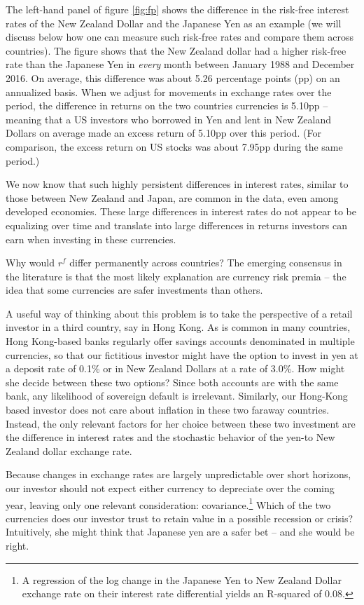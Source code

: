 \documentclass{ar-1col}
\begin{document}
The left-hand panel of figure \ref{fig:fp} shows the difference in the risk-free interest rates of the New Zealand Dollar and the Japanese Yen as an example (we will discuss below how one can measure such risk-free rates and compare them across countries). The figure shows that the New Zealand dollar had a higher risk-free rate than the Japanese Yen in \textit{every} month between January 1988 and December 2016. On average, this difference was about 5.26 percentage points (pp) on an annualized basis. When we adjust for movements in exchange rates over the period, the difference in returns on the two countries currencies is 5.10pp -- meaning that a US investors who borrowed in Yen and lent in New Zealand Dollars on average made an excess return of 5.10pp over this period. (For comparison, the excess return on US stocks was about 7.95pp during the same period.)

We now know that such highly persistent differences in interest rates, similar to those between New Zealand and Japan, are common in the data, even among developed economies. These large differences in interest rates do not appear to be equalizing over time and translate into large differences in returns investors can earn when investing in these currencies.

Why would $r^f$ differ permanently across countries? The emerging consensus in the literature is that the most likely explanation are currency risk premia -- the idea that some currencies are safer investments than others.

A useful way of thinking about this problem is to take the perspective of a retail investor in a third country, say in Hong Kong. As is common in many countries, Hong Kong-based banks regularly offer savings accounts denominated in multiple currencies, so that our fictitious investor might have the option to invest in yen at a deposit rate of 0.1\% or in New Zealand Dollars at a rate of 3.0\%. How might she decide between these two options? Since both accounts are with the same bank, any likelihood of sovereign default is irrelevant. Similarly, our Hong-Kong based investor does not care about inflation in these two faraway countries. Instead, the only relevant factors for her choice between these two investment are the difference in interest rates and the stochastic behavior of the yen-to New Zealand dollar exchange rate.

Because changes in exchange rates are largely unpredictable over short horizons, our investor should not expect either currency to depreciate over the coming year, leaving only one relevant consideration: covariance.\footnote{A regression of the log change in the Japanese Yen to New Zealand Dollar exchange rate on their interest rate differential yields an R-squared of 0.08.} Which of the two currencies does our investor trust to retain value in a possible recession or crisis? Intuitively, she might think that Japanese yen are a safer bet -- and she would be right.
\end{document}
